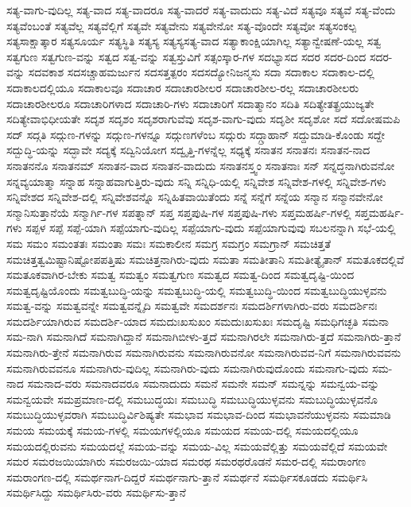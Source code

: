 {ಸತ್ಯ-ವಾಗು-ವುದಿಲ್ಲ
ಸತ್ಯ-ವಾದ
ಸತ್ಯ-ವಾದರೂ
ಸತ್ಯ-ವಾದರೆ
ಸತ್ಯ-ವಾದುದು
ಸತ್ಯ-ವಿದೆ
ಸತ್ಯವೂ
ಸತ್ಯವೆ
ಸತ್ಯ-ವೆಂದು
ಸತ್ಯವೆಂಬಂತೆ
ಸತ್ಯವೆಲ್ಲ
ಸತ್ಯವೆಲ್ಲಿಗೆ
ಸತ್ಯವೇ
ಸತ್ಯವೇನು
ಸತ್ಯವೇನೋ
ಸತ್ಯ-ವೊಂದೇ
ಸತ್ಯವೋ
ಸತ್ಯಸಂಕಲ್ಪ
ಸತ್ಯಸಾಕ್ಷಾತ್ಕಾರ
ಸತ್ಯಸೂರ್ಯ
ಸತ್ಯಸ್ಥಿತಿ
ಸತ್ಯಸ್ಯ
ಸತ್ಯಸ್ಯಸತ್ಯ-ವಾದ
ಸತ್ಯಾಕಾಂಕ್ಷಿಯಾಗಿಲ್ಲ
ಸತ್ಯಾನ್ವೇಷಣೆ-ಯಲ್ಲ
ಸತ್ವ
ಸತ್ವಗುಣ
ಸತ್ವಗುಣ-ವನ್ನು
ಸತ್ವದ
ಸತ್ವ-ವನ್ನು
ಸತ್ವಸ್ತುವಿಗೆ
ಸತ್ಸಂಸ್ಕಾರ-ಗಳ
ಸದಭ್ಯಾಸದ
ಸದರ
ಸದರ-ದಿಂದ
ಸದರ-ವನ್ನು
ಸದವಕಾಶ
ಸದಸಚ್ಚಾಹಮರ್ಜುನ
ಸದಸತ್ತತ್ಪರಂ
ಸದಸದ್ಯೋನಿಜನ್ಮಸು
ಸದಾ
ಸದಾಕಾಲ
ಸದಾಕಾಲ-ದಲ್ಲಿ
ಸದಾಕಾಲದಲ್ಲಿಯೂ
ಸದಾಕಾಲವೂ
ಸದಾಚಾರ
ಸದಾಚಾರಶೀಲರ
ಸದಾಚಾರಶೀಲ-ರಲ್ಲ
ಸದಾಚಾರಶೀಲರು
ಸದಾಚಾರಶೀಲರೂ
ಸದಾಚಾರಿಗಳಾದ
ಸದಾಚಾರಿ-ಗಳು
ಸದಾಚಾರಿಗೆ
ಸದಾತ್ಮಾನಂ
ಸದಿತಿ
ಸದಿತ್ಯೇತತ್ಪ್ರಯುಜ್ಯತೇ
ಸದಿತ್ಯೇವಾಭಿಧೀಯತೇ
ಸದೃಶ
ಸದೃಶಂ
ಸದೃಶರಾಗುವೆವು
ಸದೃಶ-ವಾಗು-ವುದು
ಸದೃಶೀ
ಸದೃಶೋ
ಸದೆ
ಸದೋಷಮಪಿ
ಸದ್
ಸದ್ಗತಿ
ಸದ್ಗುಣ-ಗಳನ್ನು
ಸದ್ಗುಣ-ಗಳನ್ನೂ
ಸದ್ಗುಣಗಳೆಂಬ
ಸದ್ಗುರು
ಸದ್ಗ್ರಾಹಾನ್
ಸದ್ದುಮಾಡಿ-ಕೊಂಡು
ಸದ್ದೇ
ಸದ್ಬುದ್ಧಿ-ಯನ್ನು
ಸದ್ಭಾವೇ
ಸದ್ಯಕ್ಕೆ
ಸದ್ವಿನಿಯೋಗ
ಸದ್ವೃತ್ತಿ-ಗಳನ್ನೆಲ್ಲ
ಸಧ್ಯಕ್ಕೆ
ಸನಾತನ
ಸನಾತನಃ
ಸನಾತನ-ನಾದ
ಸನಾತನನೊ
ಸನಾತನಮ್
ಸನಾತನ-ವಾದ
ಸನಾತನ-ವಾದುದು
ಸನಾತನಸ್ತ್ವಂ
ಸನಾತನಾಃ
ಸನ್
ಸನ್ನದ್ಧನಾಗಿರುವನೋ
ಸನ್ನವ್ಯಯಾತ್ಮಾ
ಸನ್ನಾಹ
ಸನ್ನಾಹವಾಗುತ್ತಿರು-ವುದು
ಸನ್ನಿ
ಸನ್ನಿಧಿ-ಯಲ್ಲಿ
ಸನ್ನಿವೇಶ
ಸನ್ನಿವೇಶ-ಗಳಲ್ಲಿ
ಸನ್ನಿವೇಶ-ಗಳು
ಸನ್ನಿವೇಶದ
ಸನ್ನಿವೇಶ-ದಲ್ಲಿ
ಸನ್ನಿವೇಶವನ್ನೊ
ಸನ್ನಿಹಿತವಾಯಿತೆಂದು
ಸನ್ನೆ
ಸನ್ನೆಗೆ
ಸನ್ನೆಯ
ಸನ್ಮಾನ
ಸನ್ಮಾನವೇನೋ
ಸನ್ಮಾನಿಸುತ್ತಾನೆಯೆ
ಸನ್ಮಾರ್ಗಿ-ಗಳ
ಸಪತ್ನಾನ್
ಸಪ್ತ
ಸಪ್ತಪುಷಿ-ಗಳ
ಸಪ್ತಪುಷಿ-ಗಳು
ಸಪ್ತಮಹರ್ಷಿ-ಗಳಲ್ಲಿ
ಸಪ್ತಮಹರ್ಷಿ-ಗಳು
ಸಪ್ಪಳ
ಸಪ್ಪೆ
ಸಪ್ಪೆ-ಯಾಗಿ
ಸಪ್ಪೆಯಾಗು-ವುದಿಲ್ಲ
ಸಪ್ಪೆಯಾಗು-ವುದು
ಸಪ್ಪೆಯಾಗುವುವು
ಸಬಲನನ್ನಾಗಿ
ಸಭೆ-ಯಲ್ಲಿ
ಸಮ
ಸಮಂ
ಸಮಂತತಃ
ಸಮಂತಾ
ಸಮಃ
ಸಮಕಾಲೀನ
ಸಮಗ್ರ
ಸಮಗ್ರಂ
ಸಮಗ್ರಾನ್
ಸಮಚಿತ್ತತೆ
ಸಮಚಿತ್ತತ್ವಮಿಷ್ಟಾನಿಷ್ಟೋಪಪತ್ತಿಷು
ಸಮಚಿತ್ತನಾಗಿರು-ವುದು
ಸಮತಾ
ಸಮತೀತಾನಿ
ಸಮತೀತ್ಯೈತಾನ್
ಸಮತೂಕದಲ್ಲಿವೆ
ಸಮತೂಕವಾಗಿರ-ಬೇಕು
ಸಮತ್ವ
ಸಮತ್ವಂ
ಸಮತ್ವಗುಣ
ಸಮತ್ವದ
ಸಮತ್ವ-ದಿಂದ
ಸಮತ್ವದೃಷ್ಟಿ-ಯಿಂದ
ಸಮತ್ವದೃಷ್ಟಿಯೊಂದು
ಸಮತ್ವಬುದ್ಧಿ-ಯನ್ನು
ಸಮತ್ವಬುದ್ಧಿ-ಯಲ್ಲಿ
ಸಮತ್ವಬುದ್ಧಿ-ಯಿಂದ
ಸಮತ್ವಬುದ್ಧಿಯುಳ್ಳವನು
ಸಮತ್ವ-ವನ್ನು
ಸಮತ್ವವನ್ನೇ
ಸಮತ್ವವನ್ನೈದಿ
ಸಮತ್ವವೇ
ಸಮದರ್ಶನಃ
ಸಮದರ್ಶಿಗಳಾಗಿರು-ವರು
ಸಮದರ್ಶಿನಃ
ಸಮದರ್ಶಿಯಾಗಿರುವ
ಸಮದರ್ಶಿ-ಯಾದ
ಸಮದುಃಖಸುಖಂ
ಸಮದುಃಖಸುಖಃ
ಸಮದೃಷ್ಟಿ
ಸಮಧಿಗಚ್ಛತಿ
ಸಮನಾ
ಸಮ-ನಾಗಿ
ಸಮನಾಗಿದೆ
ಸಮನಾಗಿದ್ದಾನೆ
ಸಮನಾಗಿಬೀಳು-ತ್ತದೆ
ಸಮನಾಗಿರಲೇ
ಸಮನಾಗಿರು-ತ್ತದೆ
ಸಮನಾಗಿರು-ತ್ತಾನೆ
ಸಮನಾಗಿರು-ತ್ತೇನೆ
ಸಮನಾಗಿರುವ
ಸಮನಾಗಿರುವನು
ಸಮನಾಗಿರುವನೋ
ಸಮನಾಗಿರುವವ-ನಿಗೆ
ಸಮನಾಗಿರುವವನು
ಸಮನಾಗಿರುವವನೂ
ಸಮನಾಗಿರು-ವುದಿಲ್ಲ
ಸಮನಾಗಿರು-ವುದು
ಸಮನಾಗಿರುವುದೊಂದು
ಸಮನಾಗು-ವುದು
ಸಮ-ನಾದ
ಸಮನಾದ-ವರು
ಸಮನಾದವರೂ
ಸಮನಾದುದು
ಸಮನೆ
ಸಮನೇ
ಸಮನ್
ಸಮನ್ನನ್ನು
ಸಮನ್ವಯ-ವನ್ನು
ಸಮನ್ವಯವೇ
ಸಮಪ್ರಮಾಣ-ದಲ್ಲಿ
ಸಮಬುದ್ಧಯಃ
ಸಮಬುದ್ಧಿ
ಸಮಬುದ್ಧಿಯುಳ್ಳವನು
ಸಮಬುದ್ಧಿಯುಳ್ಳವನೊ
ಸಮಬುದ್ಧಿಯುಳ್ಳವರಾಗಿ
ಸಮಬುದ್ಧಿರ್ವಿಶಿಷ್ಯತೇ
ಸಮಭಾವ
ಸಮಭಾವ-ದಿಂದ
ಸಮಭಾವನೆಯುಳ್ಳವನು
ಸಮಮಾಡಿ
ಸಮಯ
ಸಮಯಕ್ಕೆ
ಸಮಯ-ಗಳಲ್ಲಿ
ಸಮಯಗಳಲ್ಲಿಯೂ
ಸಮಯದ
ಸಮಯ-ದಲ್ಲಿ
ಸಮಯದಲ್ಲಿಯೂ
ಸಮಯದಲ್ಲಿರುವನು
ಸಮಯದಲ್ಲೆ
ಸಮಯ-ವನ್ನು
ಸಮಯ-ವಿಲ್ಲ
ಸಮಯವೆಲ್ಲಿತ್ತು
ಸಮಯವೆಲ್ಲಿದೆ
ಸಮಯವೇ
ಸಮರ
ಸಮರಜಯಿಯಾಗಿರು
ಸಮರಜಯಿ-ಯಾದ
ಸಮರಥ
ಸಮರಥರೊಡನೆ
ಸಮರ-ದಲ್ಲಿ
ಸಮರಾಂಗಣ
ಸಮರಾಂಗಣ-ದಲ್ಲಿ
ಸಮರ್ಥನಾಗ-ದಿದ್ದರೆ
ಸಮರ್ಥನಾಗು-ತ್ತಾನೆ
ಸಮರ್ಥನೆ
ಸಮರ್ಥಿಸಕೂಡದು
ಸಮರ್ಥಿಸಿ
ಸಮರ್ಥಿಸಿದ್ದು
ಸಮರ್ಥಿಸಿರು-ವರು
ಸಮರ್ಥಿಸು-ತ್ತಾನೆ
}
